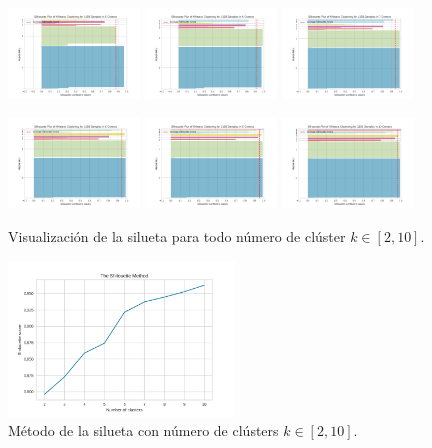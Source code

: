 \documentclass[10pt, a4paper]{article}
\begin{document}
   		\begin{figure}[H]
   			\centering
    		\includegraphics[width = 3.5cm]{silhouette_visualization_5.png}
    		\includegraphics[width = 3.5cm]{silhouette_visualization_6.png}
    		\includegraphics[width = 3.5cm]{silhouette_visualization_7.png}
    		
    		\includegraphics[width = 3.5cm]{silhouette_visualization_8.png}
    		\includegraphics[width = 3.5cm]{silhouette_visualization_9.png}
    		\includegraphics[width = 3.5cm]{silhouette_visualization_10.png}
    		
    		\caption{Visualizaci\'on de la silueta para todo n\'umero de cl\'uster $k\in[2, 10]$.}
    	\end{figure}
    	
    	\begin{figure}[H]
    		\centering
    		\includegraphics[width = 6cm]{SilhouetteM.png}
    		\caption{M\'etodo de la silueta con n\'umero de cl\'usters $k\in[2, 10]$.}
    	\end{figure}
    	
\end{document}
